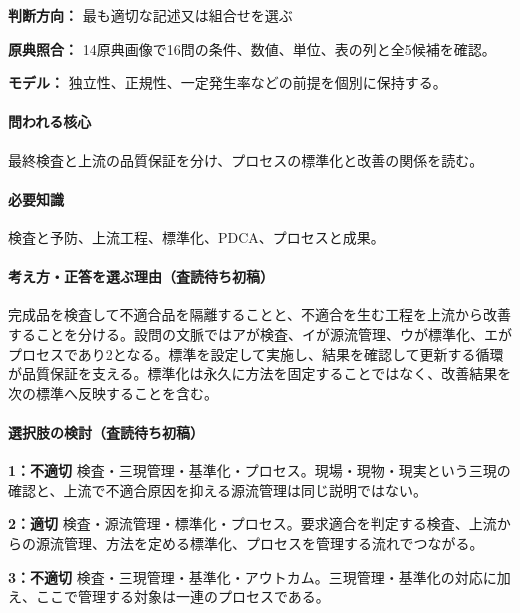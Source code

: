 \noindent\textbf{判断方向：} 最も適切な記述又は組合せを選ぶ\par

\noindent\textbf{原典照合：} 14原典画像で16問の条件、数値、単位、表の列と全5候補を確認。\par

\noindent\textbf{モデル：} 独立性、正規性、一定発生率などの前提を個別に保持する。\par

\paragraph{問われる核心} 最終検査と上流の品質保証を分け、プロセスの標準化と改善の関係を読む。

\paragraph{必要知識} 検査と予防、上流工程、標準化、PDCA、プロセスと成果。

\paragraph{考え方・正答を選ぶ理由（査読待ち初稿）} 完成品を検査して不適合品を隔離することと、不適合を生む工程を上流から改善することを分ける。設問の文脈ではアが検査、イが源流管理、ウが標準化、エがプロセスであり2となる。標準を設定して実施し、結果を確認して更新する循環が品質保証を支える。標準化は永久に方法を固定することではなく、改善結果を次の標準へ反映することを含む。

\paragraph{選択肢の検討（査読待ち初稿）}\mbox{}\par

\noindent\textbf{1：不適切} 検査・三現管理・基準化・プロセス。現場・現物・現実という三現の確認と、上流で不適合原因を抑える源流管理は同じ説明ではない。\par

\noindent\textbf{2：適切} 検査・源流管理・標準化・プロセス。要求適合を判定する検査、上流からの源流管理、方法を定める標準化、プロセスを管理する流れでつながる。\par

\noindent\textbf{3：不適切} 検査・三現管理・基準化・アウトカム。三現管理・基準化の対応に加え、ここで管理する対象は一連のプロセスである。\par

